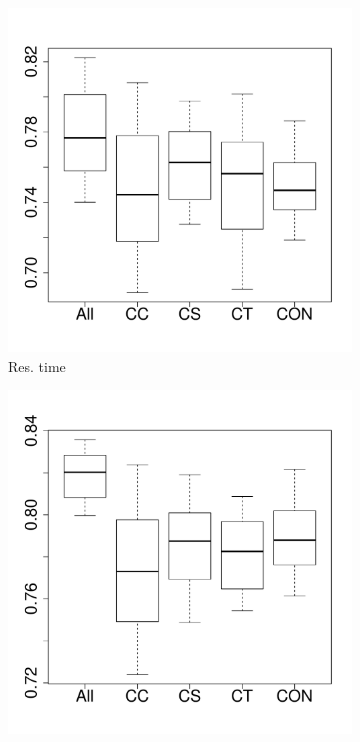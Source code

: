 \begin{figure}[t]
	\centering
        \begin{subfigure}{0.19\textwidth}
                \includegraphics[width=\linewidth]{Figures/runtime-cassandraremove-importance.pdf}
                \caption{Res. time}
        \end{subfigure}%
        \begin{subfigure}{0.19\textwidth}
                \includegraphics[width=\linewidth]{Figures/cpu-cassandraremove-importance.pdf}

\end{subfigure}
\end{figure}
